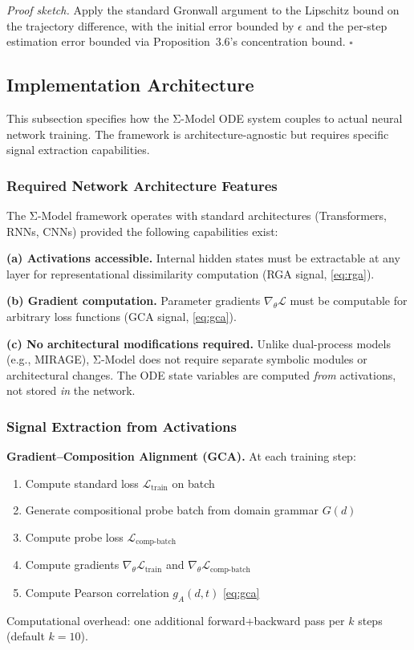 \documentclass[11pt]{article}
\theoremstyle{definition}
\theoremstyle{plain}
\begin{document}
\textit{Proof sketch.} Apply the standard Gronwall argument to the Lipschitz bound on
the trajectory difference, with the initial error bounded by $\epsilon$ and the
per-step estimation error bounded via Proposition~3.6's concentration bound. $\square$

\subsection{Implementation Architecture}\label{sec:implementation}

This subsection specifies how the Σ-Model ODE system couples to actual
neural network training. The framework is architecture-agnostic but
requires specific signal extraction capabilities.

\subsubsection{Required Network Architecture Features}

The Σ-Model framework operates with standard architectures (Transformers,
RNNs, CNNs) provided the following capabilities exist:

\textbf{(a) Activations accessible.} Internal hidden states must be
extractable at any layer for representational dissimilarity computation
(RGA signal, \eqref{eq:rga}).

\textbf{(b) Gradient computation.} Parameter gradients $\nabla_\theta
\mathcal{L}$ must be computable for arbitrary loss functions (GCA signal,
\eqref{eq:gca}).

\textbf{(c) No architectural modifications required.} Unlike dual-process
models (e.g., MIRAGE), Σ-Model does not require separate symbolic modules
or architectural changes. The ODE state variables are computed \textit{from}
activations, not stored \textit{in} the network.

\subsubsection{Signal Extraction from Activations}

\textbf{Gradient--Composition Alignment (GCA).} At each training step:
\begin{enumerate}[nosep]
\item Compute standard loss $\mathcal{L}_{\text{train}}$ on batch
\item Generate compositional probe batch from domain grammar $G(d)$
\item Compute probe loss $\mathcal{L}_{\text{comp-batch}}$
\item Compute gradients $\nabla_\theta \mathcal{L}_{\text{train}}$ and $\nabla_\theta \mathcal{L}_{\text{comp-batch}}$
\item Compute Pearson correlation $g_A(d,t)$ \eqref{eq:gca}
\end{enumerate}
Computational overhead: one additional forward+backward pass per $k$ steps
(default $k=10$).
\end{document}
